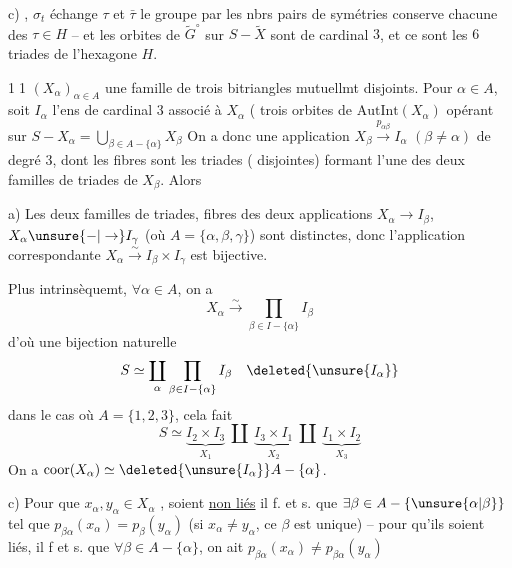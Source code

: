 c)  , $\sigma_t$ échange $\tau$ et $\bar\tau$  le groupe    par les nbrs pairs de symétries  conserve chacune des $\tau\in H$ -- et les orbites de $\widetilde G^\circ$ sur $S-\widetilde X$ sont de cardinal $3$, et ce sont les $6$ triades de l'hexagone $H$.

 

\textcircled{\scriptsize 11}  $(X_\alpha)_{\alpha\in A}$ une famille de trois bitriangles mutuellmt disjoints. Pour $\alpha\in A$, soit $I_\alpha$ l'ens de cardinal $3$ associé à $X_\alpha$ (  trois orbites de $\mathrm{AutInt}(X_\alpha)$ opérant sur $S-X_\alpha=\bigcup_{\beta\in A-\{\alpha\}}X_\beta$ On a donc une application $X_\beta\xrightarrow{p_{\alpha\beta}}I_\alpha$ $(\beta\ne\alpha)$
 de degré $3$, dont les  fibres sont les  triades ( disjointes) formant l'une des deux familles de triades de $X_\beta$. Alors

a) Les  deux familles de triades, fibres des deux applications $X_\alpha\to I_\beta$, $X_\alpha\unsure{-|\to}I_\gamma$ (où \deleted{\unsure{$\alpha$}} $A=\{\alpha,\beta,\gamma\}$) sont distinctes, donc l'application correspondante $X_\alpha\xrightarrow{\sim}I_\beta\times I_\gamma$ est bijective.

Plus intrinsèquemt, $\forall\alpha\in A$, on a
\[
 X_\alpha\xrightarrow{\sim}\prod_{\beta\in I-\{\alpha\}} I_\beta
\]
d'où une bijection naturelle
\[
 S\simeq\coprod_\alpha\prod_{\beta\in I-\{\alpha\}}I_\beta\quad\deleted{\unsure{I_{\alpha}}}
\]
dans le cas où $A=\{1,2,3\}$, cela fait
\[
 S\simeq\underbrace{I_2\times I_3}_{X_1}\ \amalg\
 \underbrace{I_3\times I_1}_{X_2}\ \amalg\
 \underbrace{I_1\times I_2}_{X_3}
\]
On a $\mathrm{coor}(X_\alpha)\simeq\deleted{\unsure{I_\alpha}}A-\{\alpha\}$.

c) Pour que  $x_\alpha,y_\alpha\in X_\alpha$ , soient \uline{non liés} il f. et s. que $\exists\beta\in A-\{\unsure{\alpha|\beta}\}$  tel que $p_{\beta\alpha}(x_\alpha)=p_\beta(y_\alpha)$ (si $x_\alpha\ne y_\alpha$, ce $\beta$ est unique) -- pour qu'ils soient liés, il f et s. que $\forall\beta\in A-\{\alpha\}$, on ait $p_{\beta\alpha}(x_\alpha)\ne p_{\beta\alpha}(y_\alpha)$


